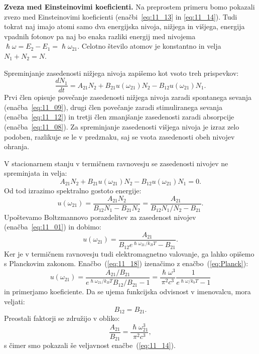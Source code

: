 \begin{example}{\bf Zveza med Einsteinovimi koeficienti.}
\label{11_ex_Ei}
Na preprostem primeru bomo pokazali zvezo med Einsteinovimi koeficienti 
(enačbi~\ref{eq:11_13} in \ref{eq:11_14}). Tudi tokrat naj imajo atomi samo 
dva energijska nivoja, nižjega in 
višjega, energija vpadnih fotonov pa naj bo enaka razliki energij med nivojema
$\hslash \omega  = E_2 - E_1= \hslash \omega_{21}$. 
Celotno število atomov je konstantno
in velja $N_1 + N_2 = N$. 

Spreminjanje zasedenosti nižjega nivoja zapišemo kot vsoto treh prispevkov:
\begin{equation}
\frac{dN_1}{dt} = A_{21}N_2 + B_{21}u(\omega_{21})N_2 - B_{12}u(\omega_{21})N_1.
\label{eq:11_15}
\end{equation}
Prvi člen opisuje povečanje zasedenosti nižjega nivoja zaradi 
spontanega sevanja (enačba~\ref{eq:11_09}), drugi člen povečanje 
zaradi stimuliranega sevanja (enačba~\ref{eq:11_12}) in tretji člen
zmanjšanje zasedenosti zaradi absorpcije (enačba~\ref{eq:11_08}).
Za spreminjanje zasedenosti višjega nivoja je izraz zelo podoben, razlikuje
se le v predznaku, saj se vsota zasedenosti obeh nivojev ohranja.

V stacionarnem stanju v termičnem ravnovesju se zasedenosti nivojev 
ne spreminjata in velja:
\begin{equation}
A_{21}N_2 + B_{21}u(\omega_{21})N_2 - B_{12}u(\omega_{21})N_1 = 0.
\label{eq:11_16}
\end{equation}
Od tod izrazimo spektralno gostoto energije:
\begin{equation}
u(\omega_{21}) = \frac{A_{21}N_2}{B_{12}N_1-B_{21}N_2} = 
\frac{A_{21}}{B_{12}N_1/N_2 - B_{21}}.
\label{eq:11_17}
\end{equation}
Upoštevamo Boltzmannovo porazdelitev za zasedenost nivojev 
(enačba~\ref{eq:11_01}) in dobimo:
\begin{equation}
u(\omega_{21}) = \frac{A_{21}}{B_{12}e^{\hslash \omega_{21}/k_B T} - B_{21}}.
\label{eq:11_18}
\end{equation}
Ker je v termičnem ravnovesju tudi elektromagnetno valovanje, ga 
lahko opišemo s Planckovim zakonom. Enačbo~(\ref{eq:11_18}) 
izenačimo z enačbo~(\ref{eq:Planck}):
\begin{equation}
u(\omega_{21}) = \frac{A_{21}/B_{21}}{e^{\hslash \omega_{21}/k_B T}B_{12}/B_{21} - 1} = 
\frac{\hslash \omega^3}{\pi^2c^3}\frac{1}{e^{\hslash \omega/k_bT}-1}
\end{equation}
in primerjamo koeficiente. Da se ujema funkcijska odvisnost v 
imenovalcu, mora veljati:
\begin{equation}
B_{12} = B_{21}.
\label{eq:11_19}
\end{equation}
Preostali faktorji se združijo v obliko:
\begin{equation}
\frac{A_{21}}{B_{21}} = \frac{\hslash \omega_{21}^3}{\pi^2c^3},
\label{eq:11_20}
\end{equation}
s čimer smo pokazali še veljavnost enačbe~(\ref{eq:11_14}).


\end{example}
